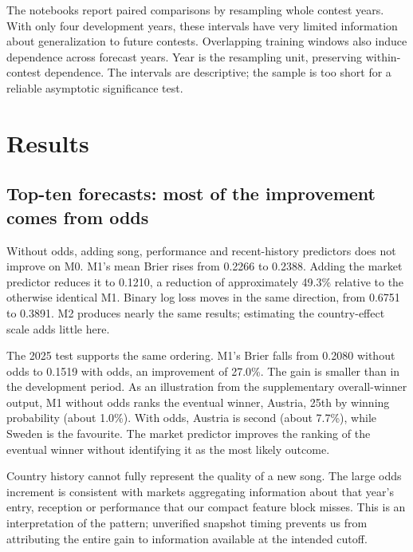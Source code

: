 \documentclass[11pt,a4paper]{article}
\begin{document}
The notebooks report paired comparisons by resampling whole contest years. With only four development years, these intervals have very limited information about generalization to future contests. Overlapping training windows also induce dependence across forecast years. Year is the resampling unit, preserving within-contest dependence. The intervals are descriptive; the sample is too short for a reliable asymptotic significance test.

\section{Results}
\subsection{Top-ten forecasts: most of the improvement comes from odds}
\begin{table}[H]\centering\small
\caption{Task A: top-ten probability losses. M0 uses country history and has no odds predictor.}\label{tab:A}

\end{table}
Without odds, adding song, performance and recent-history predictors does not improve on M0. M1's mean Brier rises from 0.2266 to 0.2388. Adding the market predictor reduces it to 0.1210, a reduction of approximately 49.3\% relative to the otherwise identical M1. Binary log loss moves in the same direction, from 0.6751 to 0.3891. M2 produces nearly the same results; estimating the country-effect scale adds little here.

The 2025 test supports the same ordering. M1's Brier falls from 0.2080 without odds to 0.1519 with odds, an improvement of 27.0\%. The gain is smaller than in the development period. As an illustration from the supplementary overall-winner output, M1 without odds ranks the eventual winner, Austria, 25th by winning probability (about 1.0\%). With odds, Austria is second (about 7.7\%), while Sweden is the favourite. The market predictor improves the ranking of the eventual winner without identifying it as the most likely outcome.

Country history cannot fully represent the quality of a new song. The large odds increment is consistent with markets aggregating information about that year's entry, reception or performance that our compact feature block misses. This is an interpretation of the pattern; unverified snapshot timing prevents us from attributing the entire gain to information available at the intended cutoff.
\end{document}
